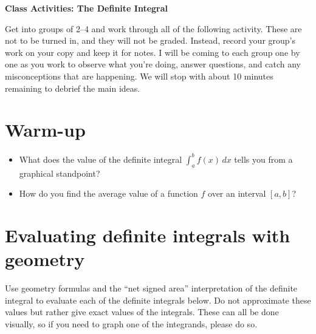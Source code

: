 \documentclass[11pt]{article}
\begin{document}
	
	\thispagestyle{empty}
	\renewcommand{\headrulewidth}{0.0pt}
	\thispagestyle{fancy}
	\lfoot{}
	\cfoot{}
	\rfoot{}	
	
	\vspace*{0in}

		\begin{center}
			\begin{large}
			\textbf{Class Activities: The Definite Integral} \\
			\end{large}
		\end{center}
	
Get into groups of 2--4 and work through all of the following activity. These are not to be turned in, and they will not be graded. Instead, record your group's work on your copy and keep it for notes. I will be coming to each group one by one as you work to observe what you're doing, answer questions, and catch any misconceptions that are happening. We will stop with about 10 minutes remaining to debrief the main ideas.\\

\section{Warm-up}

\begin{itemize}
	\item What does the value of the definite integral $\int_a^b f(x) \, dx$ tells you from a graphical standpoint?
	\vspace{0.75in}
	
	\item How do you find the average value of a function $f$ over an interval $[a,b]$? 
	\vspace{0.75in}
	
\end{itemize}

\section{Evaluating definite integrals with geometry}

Use geometry formulas and the ``net signed area'' interpretation of the definite integral to evaluate each of the definite integrals below. Do not approximate these values but rather give exact values of the integrals. These can all be done visually, so if you need to graph one of the integrands, please do so. 
\end{document}
